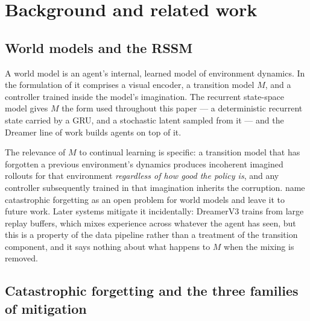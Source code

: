 %

\section{Background and related work}
\label{sec:related}

\subsection{World models and the RSSM}
\label{sec:related:worldmodels}

A world model is an agent's internal, learned model of environment dynamics.
In the formulation of \citet{ha2018worldmodels} it comprises a visual encoder,
a transition model $M$, and a controller trained inside the model's
imagination. The recurrent state-space model \citep{hafner2019planet} gives $M$
the form used throughout this paper --- a deterministic recurrent state carried
by a GRU, and a stochastic latent sampled from it --- and the Dreamer line of
work \citep{hafner2020dreamer, hafner2021dreamerv2, hafner2023dreamerv3} builds
agents on top of it.

The relevance of $M$ to continual learning is specific: a transition model that
has forgotten a previous environment's dynamics produces incoherent imagined
rollouts for that environment \emph{regardless of how good the policy is}, and
any controller subsequently trained in that imagination inherits the corruption.
\citet{ha2018worldmodels} name catastrophic forgetting as an open problem for
world models and leave it to future work. Later systems mitigate it
incidentally: DreamerV3 \citep{hafner2023dreamerv3} trains from large replay
buffers, which mixes experience across whatever the agent has seen, but this is
a property of the data pipeline rather than a treatment of the transition
component, and it says nothing about what happens to $M$ when the mixing is
removed.

\subsection{Catastrophic forgetting and the three families of mitigation}
\label{sec:related:forgetting}

